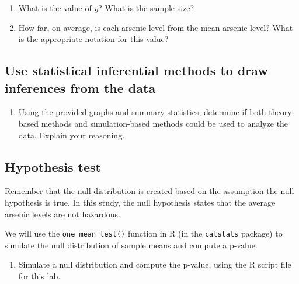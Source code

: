 \documentclass[
]{report}
\providecommand{\tightlist}{%
  \setlength{\itemsep}{0pt}\setlength{\parskip}{0pt}}
\begin{document}
\vspace{0.8in}

\begin{enumerate}
\def\labelenumi{\arabic{enumi}.}
\setcounter{enumi}{5}
\item
  What is the value of \(\bar{y}\)? What is the sample size?
  \vspace{0.25in}
\item
  How far, on average, is each arsenic level from the mean arsenic level? What is the appropriate notation for this value?
\end{enumerate}

\vspace{0.4in}

\subsection*{Use statistical inferential methods to draw inferences from the data}\label{use-statistical-inferential-methods-to-draw-inferences-from-the-data-1}

\begin{enumerate}
\def\labelenumi{\arabic{enumi}.}
\setcounter{enumi}{7}
\tightlist
\item
  Using the provided graphs and summary statistics, determine if both theory-based methods and simulation-based methods could be used to analyze the data. Explain your reasoning.
\end{enumerate}

\vspace{1in}

\subsection*{Hypothesis test}\label{hypothesis-test}

Remember that the null distribution is created based on the assumption the null hypothesis is true. In this study, the null hypothesis states that the average arsenic levels are not hazardous.

We will use the \texttt{one\_mean\_test()} function in R (in the \texttt{catstats} package) to simulate the null distribution of sample means and compute a p-value.

\newpage

\begin{enumerate}
\def\labelenumi{\arabic{enumi}.}
\setcounter{enumi}{8}
\tightlist
\item
  Simulate a null distribution and compute the p-value, using the R script file for this lab.
\end{enumerate}
\end{document}
